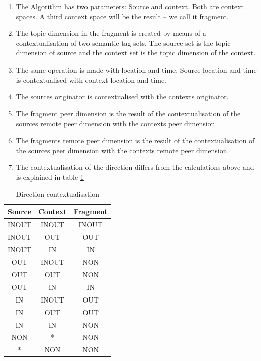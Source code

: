 \begin{enumerate}
    \item The Algorithm has two parameters: Source and context. Both are context spaces. A third context space will be the result -- we call it fragment.
\item The topic dimension in the fragment is created by means of a contextualisation of two semantic tag sets. The source set is the topic dimension of source and the context set is the topic dimension of the context.
\item The same operation is made with location and time. Source location and time is contextualised with context location and time.
\item The sources originator is contextualised with the contexts originator.
\item
The fragment peer dimension is the result of the contextualisation of the sources remote peer dimension with the contexts peer dimension.
\item
The fragments remote peer dimension is the result of the contextualisation of the sources peer dimension with the contexts remote peer dimension.
\item
The contextualisation of the direction differs from the calculations above and is explained in table \ref{tab:directionCalculation}
\end{enumerate}

\begin{table}[t]
\centering
\begin{tabular}{|c|c|c|}
\hline
Source & Context & Fragment \\
\hline
INOUT & INOUT & INOUT \\
\hline
INOUT & OUT & OUT \\
\hline
INOUT & IN & IN \\
\hline
OUT & INOUT & NON \\
\hline
OUT & OUT & NON \\
\hline
OUT & IN & IN \\
\hline
IN & INOUT & OUT \\
\hline
IN & OUT & OUT \\
\hline
IN & IN & NON \\
\hline
NON & * & NON \\
\hline
* & NON & NON \\
\hline
\end{tabular}
\caption{Direction contextualisation}
\label{tab:directionCalculation}
\end{table}

